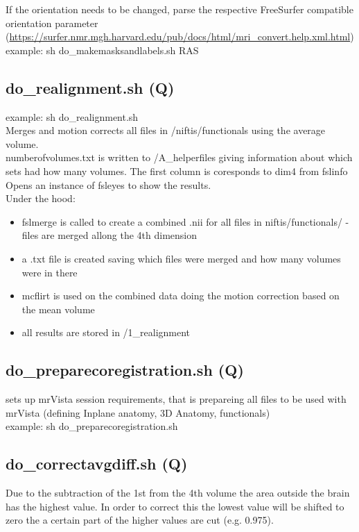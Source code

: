 \documentclass[12pt,a4paper]{scrartcl}
\begin{document}
\noindent If the orientation needs to be changed, parse the respective FreeSurfer compatible orientation parameter (\href{https://surfer.nmr.mgh.harvard.edu/pub/docs/html/mri_convert.help.xml.html}{https://surfer.nmr.mgh.harvard.edu/pub/docs/html/mri\_convert.help.xml.html})\\

\noindent example: sh do\_makemasksandlabels.sh RAS

\subsection{do\_realignment.sh (Q)}
example: sh do\_realignment.sh\\

\noindent Merges and motion corrects all files in /niftis/functionals using the average volume.\\

\noindent numberofvolumes.txt is written to /A\_helperfiles giving information about which sets had how many volumes. The first column is coresponds to dim4 from fslinfo\\

\noindent Opens an instance of fsleyes to show the results.\\

\noindent Under the hood:
\begin{itemize}
\item fslmerge is called to create a combined .nii for all files in niftis/functionals/ - files are merged allong the 4th dimension
\item a .txt file is created saving which files were merged and how many volumes were in there
\item mcflirt is used on the combined data doing the motion correction based on the mean volume
\item all results are stored in /1\_realignment
\end{itemize}

\subsection{do\_preparecoregistration.sh (Q)}
sets up mrVista session requirements, that is prepareing all files to be used with mrVista (defining Inplane anatomy, 3D Anatomy, functionals)\\

\noindent example: sh do\_preparecoregistration.sh

\subsection{do\_correctavgdiff.sh (Q)}
Due to the subtraction of the 1st from the 4th volume the area outside the brain has the highest value. In order to correct this the lowest value will be shifted to zero the a certain part of the higher values are cut (e.g. 0.975).\\
\end{document}

